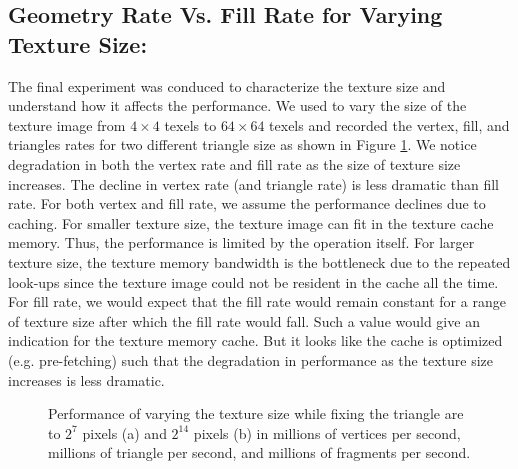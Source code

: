 \subsection{Geometry Rate Vs. Fill Rate for Varying Texture Size:}
The final experiment was conduced to characterize the texture size and understand how it affects the performance. We used \protect{\wes} to vary the size of the texture image from $4\times4$ texels to $64\times64$ texels and recorded the vertex, fill, and triangles rates for two different triangle size as shown in Figure \ref{fig:fill_geo5}. We notice degradation in both the vertex rate and fill rate as the size of texture size increases. The decline in vertex rate (and triangle rate) is less dramatic than fill rate. For both vertex and fill rate, we assume the performance declines due to caching. For smaller texture size, the texture image can fit in the texture cache memory. Thus, the performance is limited by the operation itself. For larger texture size, the texture memory bandwidth is the bottleneck due to the repeated look-ups since the texture image could not be resident in the cache all the time. For fill rate, we would expect that the fill rate would remain constant for a range of texture size after which the fill rate would fall. Such a value would give an indication for the texture memory cache. But it looks like the cache is optimized (e.g. pre-fetching) such that the degradation in performance as the texture size increases is less dramatic. 

\begin{figure}[!tbh]
 \centering  
  \caption{Performance of varying the texture size while fixing the triangle are to $2^{7}$ pixels (a) and $2^{14}$ pixels (b) in millions of vertices per second, millions of triangle per second, and millions of fragments per second. }
   \label{fig:fill_geo5}
\end{figure} 
